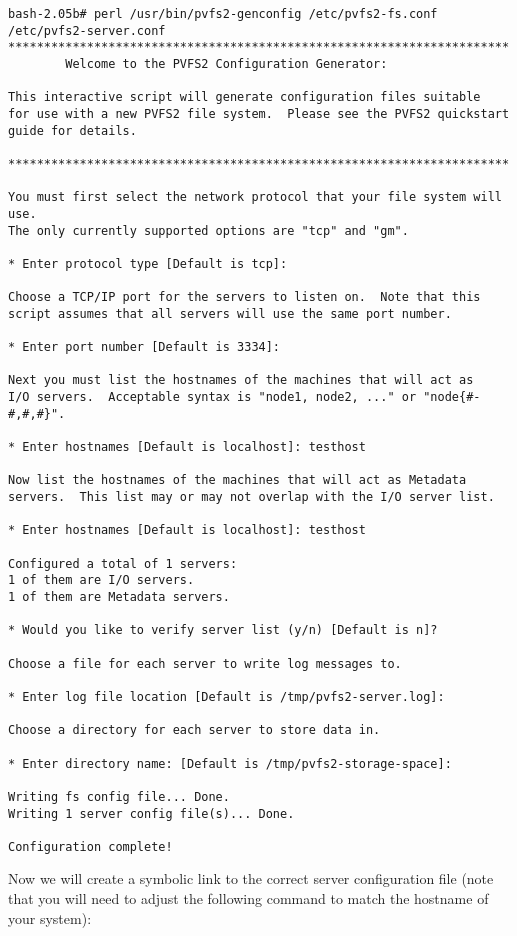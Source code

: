 \documentclass[11pt, letterpaper]{article}
\begin{document}
\begin{verbatim}
bash-2.05b# perl /usr/bin/pvfs2-genconfig /etc/pvfs2-fs.conf /etc/pvfs2-server.conf
**********************************************************************
        Welcome to the PVFS2 Configuration Generator:

This interactive script will generate configuration files suitable
for use with a new PVFS2 file system.  Please see the PVFS2 quickstart
guide for details.

**********************************************************************

You must first select the network protocol that your file system will use.
The only currently supported options are "tcp" and "gm".

* Enter protocol type [Default is tcp]: 

Choose a TCP/IP port for the servers to listen on.  Note that this
script assumes that all servers will use the same port number.

* Enter port number [Default is 3334]: 

Next you must list the hostnames of the machines that will act as
I/O servers.  Acceptable syntax is "node1, node2, ..." or "node{#-#,#,#}".

* Enter hostnames [Default is localhost]: testhost

Now list the hostnames of the machines that will act as Metadata
servers.  This list may or may not overlap with the I/O server list.

* Enter hostnames [Default is localhost]: testhost

Configured a total of 1 servers:
1 of them are I/O servers.
1 of them are Metadata servers.

* Would you like to verify server list (y/n) [Default is n]? 

Choose a file for each server to write log messages to.

* Enter log file location [Default is /tmp/pvfs2-server.log]: 

Choose a directory for each server to store data in.

* Enter directory name: [Default is /tmp/pvfs2-storage-space]: 

Writing fs config file... Done.
Writing 1 server config file(s)... Done.

Configuration complete!
\end{verbatim}

Now we will create a symbolic link to the correct server configuration file 
(note that you will need to adjust the following command to match the 
hostname of your system):
\end{document}
